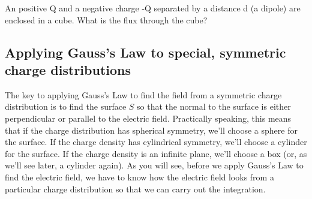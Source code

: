 \documentclass{ximera}
\begin{document}
 
 \begin{question}  
An positive Q and a negative charge -Q separated by a distance d (a dipole) are enclosed in a cube. What is the flux through the cube?
\begin{multipleChoice}  
\end{multipleChoice}  
\end{question} 
 

\subsection{Applying Gauss's Law to special, symmetric charge distributions} 

The key to applying Gauss's Law to find the field from a symmetric charge distribution is to find the surface $S$ so that the normal to the surface is either perpendicular or parallel to the electric field. Practically speaking, this means that if the charge distribution has spherical symmetry, we'll choose a sphere for the surface. If the charge density has cylindrical symmetry, we'll choose a cylinder for the surface. If the charge density is an infinite plane, we'll choose a box (or, as we'll see later, a cylinder again). As you will see, before we apply Gauss's Law to find the electric field, we have to know how the electric field looks from a particular charge distribution so that we can carry out the integration.
\end{document}
